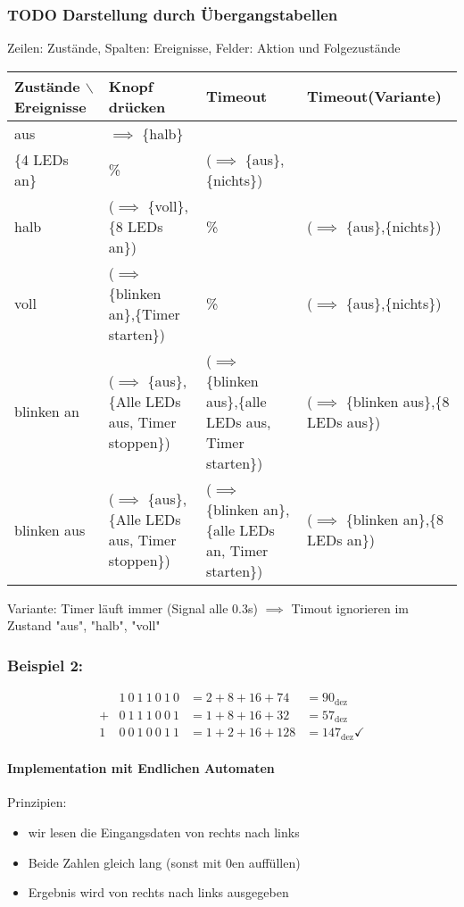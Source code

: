 \documentclass[a4paper]{scrartcl}
\theoremstyle{definition}
\theoremstyle{plain}
\theoremstyle{remark}
\theoremstyle{remark}
\begin{document}
\subsubsection{{\bfseries\sffamily TODO} Darstellung durch Übergangstabellen}
\label{sec-3-3-2}
Zeilen: Zustände, Spalten: Ereignisse, Felder: Aktion und Folgezustände
\begin{center}
\begin{tabular}{llll}
Zustände $\backslash$ Ereignisse & Knopf drücken & Timeout & Timeout(Variante)\\
\hline
aus & $\implies$ \{halb\} \\ \{4 LEDs an\} & \% & ($\implies$ \{aus\},\{nichts\})\\
halb & ($\implies$ \{voll\},\{8 LEDs an\}) & \% & ($\implies$ \{aus\},\{nichts\})\\
voll & ($\implies$ \{blinken an\},\{Timer starten\}) & \% & ($\implies$ \{aus\},\{nichts\})\\
blinken an & ($\implies$ \{aus\},\{Alle LEDs aus, Timer stoppen\}) & ($\implies$ \{blinken aus\},\{alle LEDs aus, Timer starten\}) & ($\implies$ \{blinken aus\},\{8 LEDs aus\})\\
blinken aus & ($\implies$ \{aus\},\{Alle LEDs aus, Timer stoppen\}) & ($\implies$ \{blinken an\},\{alle LEDs an, Timer starten\}) & ($\implies$ \{blinken an\},\{8 LEDs an\})\\
\end{tabular}
\end{center}

Variante: Timer läuft immer (Signal alle 0.3s) $\implies$ Timout ignorieren im Zustand "aus", "halb", "voll"
\subsubsection{Beispiel 2:}
\label{sec-3-3-3}
\begin{align}
&1~0~1~1~0~1~0 &= 2 + 8 + 16 + 74 &= 90_{\text{dez}} \\
+&0~1~1~1~0~0~1 &= 1 + 8 + 16 + 32 &= 57_{\text{dez}} \\
\hline
1~&0~0~1~0~0~1~1 &= 1 + 2 + 16 + 128 &= 147_{\text{dez}}\checkmark
\end{align}
\paragraph{Implementation mit Endlichen Automaten}
\label{sec-3-3-3-1}
Prinzipien:
\begin{itemize}
\item wir lesen die Eingangsdaten von rechts nach links
\item Beide Zahlen gleich lang (sonst mit 0en auffüllen)
\item Ergebnis wird von rechts nach links ausgegeben
\end{itemize}
\end{document}
